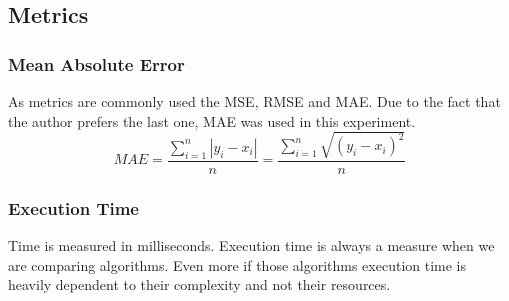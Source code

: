\subsection{Metrics}
\subsubsection{Mean Absolute Error}
As metrics are commonly used the MSE, RMSE and MAE. Due to the fact that the author prefers the last one, MAE was used in this experiment.
\begin{equation}
MAE = \frac{\sum_{i=1}^{n}{|y_{i}-x_{i}|} }{n} = \frac{\sum_{i=1}^{n}\sqrt{{(y_{i}-x_{i})}^{2}}}{n}
\end{equation}
\subsubsection{Execution Time}
Time is measured in milliseconds.
Execution time is always a measure when we are comparing algorithms. 
Even more if those algorithms execution time is heavily dependent to their complexity and not their resources.
